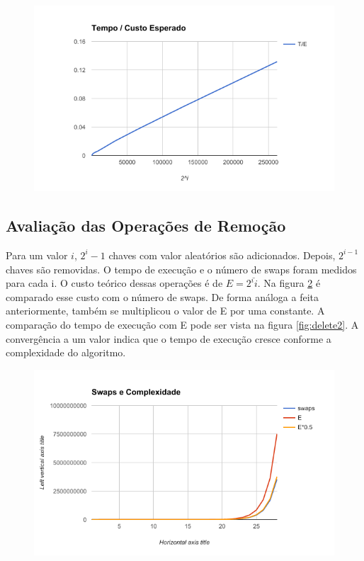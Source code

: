 \documentclass{iiufrgs}
\begin{document}
\begin{figure}[H]
\includegraphics[width=0.75\linewidth]{update}
\centering
\caption{}{}
\label{fig:update1}
\end{figure}

\subsection{Avaliaç\~ao das Operaç\~oes de Remoç\~ao}
Para um valor $i$, $2^{i} - 1$ chaves com valor aleatórios s\~ao adicionados. Depois, $2^{i - 1}$ chaves s\~ao removidas. O tempo de execuç\~ao e o número de swaps foram medidos para cada i. O custo teórico dessas operaç\~oes é de $E = 2^i \dot i$. Na figura \ref{fig:delete1} é comparado esse custo com o número de swaps. De forma análoga a feita anteriormente, também se multiplicou o valor de E por uma constante. A comparaç\~ao do tempo de execuç\~ao com E pode ser vista na figura \ref{fig:delete2}. A convergência a um valor indica que o tempo de execuç\~ao cresce conforme a complexidade do algoritmo.

\begin{figure}[H]
\includegraphics[width=0.75\linewidth]{delete1}
\centering
\caption{}{}
\label{fig:delete1}
\end{figure}
\end{document}
